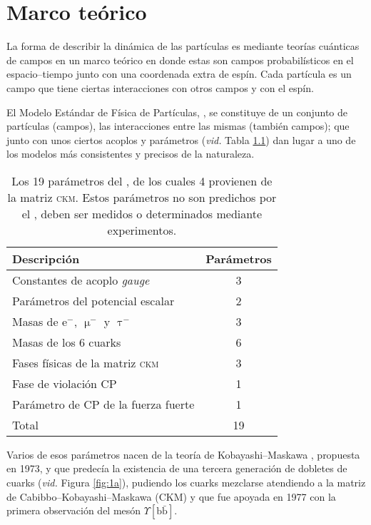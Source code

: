 \chapter{Marco teórico}
\label{cha:theo}



\color{dieg}
\color{vero} La forma de describir la dinámica \color{norm} de las partículas es mediante  teorías cuánticas de campos  en un marco teórico en donde estas son campos probabilísticos en el espacio--tiempo junto con una coordenada extra de espín.
Cada partícula es un campo que tiene ciertas interacciones con otros campos y con el espín.%
\color{norm}


El \color{vero} Modelo Estándar de Física de Partículas, \stdmod, \color{norm} se constituye de un conjunto de partículas (campos), \color{vero}las  interacciones \color{norm} entre las mismas (también campos); que junto con unos ciertos acoplos y parámetros (\emph{vid.} Tabla \ref{tab_stdparams}) dan lugar a uno de los modelos más consistentes y precisos de la naturaleza.

\begin{table}[H]
\centering
\begin{tabular}{lc}
\toprule
Descripción & Parámetros \\ \midrule
Constantes de acoplo \textit{\emph{gauge}} & 3\\
Parámetros del potencial escalar & 2 \\
Masas de $\mathrm{e^-}$, ${\upmu^-}$ y ${\uptau^-}$ & 3 \\
Masas de los 6 cuarks & 6\\
Fases físicas de la matriz  \textsc{ckm}  & 3 \\
Fase de violación CP & 1\\
Parámetro de CP de la fuerza fuerte & 1\\ \midrule
Total & 19\\
\bottomrule
\end{tabular}
\caption{Los 19 parámetros del \stdmod, de los cuales 4 provienen de la matriz \textsc{ckm}. Estos parámetros no son predichos por el \stdmod, deben ser medidos o determinados mediante experimentos.}	\label{tab_stdparams}
\end{table}
%
\color{norm} 
%
%
Varios de esos parámetros nacen de la teoría de Kobayashi--Maskawa \cite{km1}, propuesta en 1973, y que predecía la existencia de una tercera generación de dobletes de cuarks (\emph{vid.} Figura \ref{fig:1a}), pudiendo los cuarks mezclarse atendiendo a la matriz de Cabibbo--Kobayashi--Maskawa (CKM)  y que fue \color{vero} apoyada \color{norm} en 1977 con la primera observación del mesón $\Upsilon [\mathrm{b\bar{b}}]$.
%

